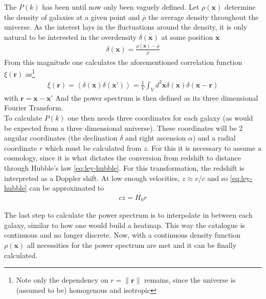 The $P(k)$ has been until now only been vaguely defined. Let  $\rho(\textbf{x})$ determine the density of galaxies at a given point and $ \overline{\rho}$ the average density throughout the universe. As the interest lays in the fluctuations around the density, it is only natural to be interested in the overdensity $\delta(\textbf{x})$ at some position $\textbf{x}$
\begin{align}
	\delta(\textbf{x}) = \frac{\rho\left( \textbf{x} \right) - \overline{\rho}}{\overline{\rho}}
	\label{eq:overdensity)}
\end{align}
From this magnitude one calculates the aforementioned correlation function $\xi(\textbf{r})$ as\footnote{Note only the dependency on $r = \|\textbf{r}\|$ remains, since the universe is (assumed to be) homogenous and isotropic}
\begin{align}
	\xi(\textbf{r}) = \left<\delta(\textbf{x}) \delta(\textbf{x}') \right> = \frac{1}{V}\int_{V}^{}  d^3 \textbf{x} \delta(\textbf{x}) \delta\left(\textbf{x} - \textbf{r}  \right) 
\end{align} with $\textbf{r} = \textbf{x} - \textbf{x}'$
And the power spectrum is then defined as its three dimensional Fourier Transform. \\

To calculate $P(k)$ one then needs three coordinates for each galaxy (as would be expected from a three dimensional universe). These coordinates will be 2 angular coordinates (the declination $\delta$ and right ascension $\alpha$) and a radial coordinate $r$ which must be calculated from $z$. For this it is necessary to assume a cosmology, since it is what dictates the conversion from redshift to distance through Hubble's law \eqref{eq:ley-hubble}. For this transformation, the redshift is interpreted as a Doppler shift. At low enough velocities, $z\approx v /c$ and so \eqref{eq:ley-hubble} can be approximated to 
\begin{align}
c z = H_0 r	
\end{align}

The last step to calculate the power spectrum is to interpolate in between each galaxy, similar to how one would build a heatmap. This way the catalogue is continuous and no longer discrete. Now, with a continuous density function $\rho(\textbf{x})$ all necessities for the power spectrum are met and it can be finally calculated. \\

